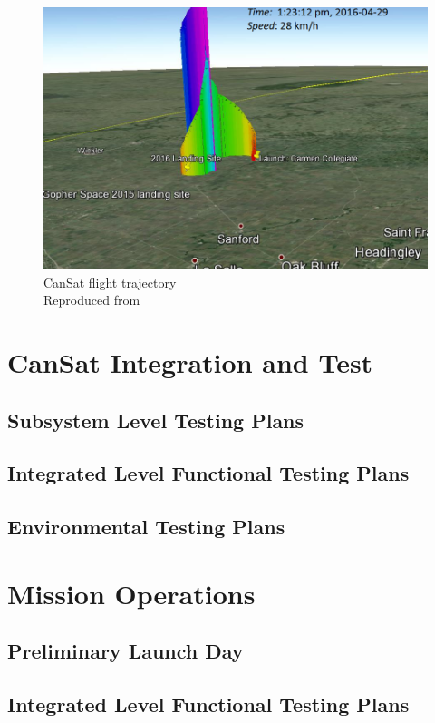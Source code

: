 \documentclass[10pt, a4paper]{article}
\begin{document}
\begin{figure}
\centering
\includegraphics[scale=0.6]{flight_path.png}
\caption{CanSat flight trajectory\\
Reproduced from \cite{gopher}}
\label{fig:flight_path}
\end{figure}


\newpage

\section{CanSat Integration and Test}
\subsection{Subsystem Level Testing Plans}
\subsection{Integrated Level Functional Testing Plans}
\subsection{Environmental Testing Plans}


\newpage

\section{Mission Operations}
\subsection{Preliminary Launch Day}
\subsection{Integrated Level Functional Testing Plans}
\end{document}

